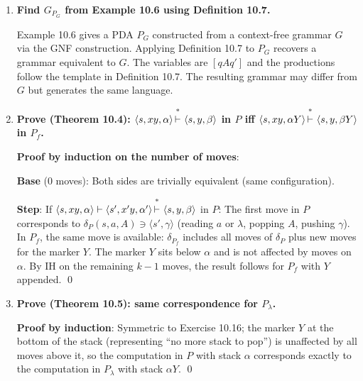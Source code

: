 \begin{enumerate}[{10.}1. ]
\begin{enumerate}
\item \textbf{Counting automaton}: No; the string lengths are unbounded.

\item \textbf{Grammar from PDA}: Apply Definition 10.7 to part (b).
\end{enumerate}

\item \textbf{Find $G_{P_G}$ from Example 10.6 using Definition 10.7.}

Example 10.6 gives a PDA $P_G$ constructed from a context-free grammar $G$ via the GNF construction. Applying Definition 10.7 to $P_G$ recovers a grammar equivalent to $G$. The variables are $[q A q']$ and the productions follow the template in Definition 10.7. The resulting grammar may differ from $G$ but generates the same language.

\item \textbf{Prove (Theorem 10.4): $\langle s,xy,\alpha\rangle\Dvdash\langle s,y,\beta\rangle$ in $P$ iff $\langle s,xy,\alpha Y\rangle\Dvdash\langle s,y,\beta Y\rangle$ in $P_f$.}

\textbf{Proof by induction on the number of moves}:

\textbf{Base} (0 moves): Both sides are trivially equivalent (same configuration).

\textbf{Step}: If $\langle s,xy,\alpha\rangle\vdash\langle s',x'y,\alpha'\rangle\Dvdash\langle s,y,\beta\rangle$ in $P$:
The first move in $P$ corresponds to $\delta_P(s,a,A)\ni\langle s',\gamma\rangle$ (reading $a$ or $\lambda$, popping $A$, pushing $\gamma$). In $P_f$, the same move is available: $\delta_{P_f}$ includes all moves of $\delta_P$ plus new moves for the marker $Y$. The marker $Y$ sits below $\alpha$ and is not affected by moves on $\alpha$. By IH on the remaining $k-1$ moves, the result follows for $P_f$ with $Y$ appended. \qed

\item \textbf{Prove (Theorem 10.5): same correspondence for $P_\lambda$.}

\textbf{Proof by induction}: Symmetric to Exercise 10.16; the marker $Y$ at the bottom of the stack (representing ``no more stack to pop'') is unaffected by all moves above it, so the computation in $P$ with stack $\alpha$ corresponds exactly to the computation in $P_\lambda$ with stack $\alpha Y$. \qed


\end{enumerate}
